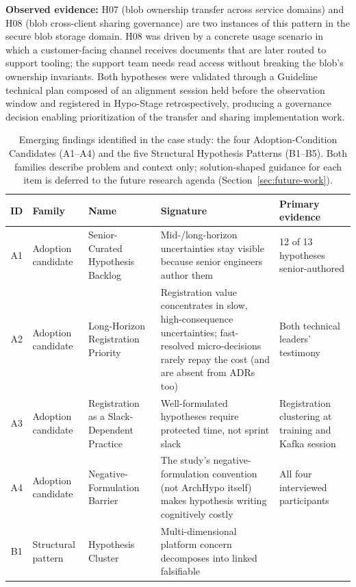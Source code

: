 \textbf{Observed evidence:} H07 (blob ownership transfer across service domains)
and H08 (blob cross-client sharing governance) are two instances of this pattern
in the secure blob storage domain. H08 was driven by a concrete usage scenario
in which a customer-facing channel receives documents that are later routed to
support tooling; the support team needs read access without breaking the blob's ownership invariants. 
Both hypotheses were validated through a Guideline technical plan composed of an alignment
session held before the observation window and registered in Hypo-Stage retrospectively,
producing a governance decision enabling prioritization of the transfer and sharing
implementation work.

\begin{table}[htbp]
\caption{Emerging findings identified in the case study: the four
Adoption-Condition Candidates (A1--A4) and the
five Structural Hypothesis Patterns (B1--B5). Both families describe problem and context only;
solution-shaped guidance for each item is deferred to the future research
agenda (Section~\ref{sec:future-work}).}
\label{tab:emerging-patterns}
\centering\small
\setlength{\tabcolsep}{4pt}
\begin{tabular}{clp{3.6cm}p{5.2cm}p{2.6cm}}
\toprule
\textbf{ID} & \textbf{Family} & \textbf{Name} & \textbf{Signature} &
\textbf{Primary evidence} \\
\midrule
A1 & Adoption candidate & Senior-Curated Hypothesis Backlog
   & Mid-/long-horizon uncertainties stay visible because senior engineers
     author them
   & 12 of 13 hypotheses senior-authored \\
A2 & Adoption candidate & Long-Horizon Registration Priority
   & Registration value concentrates in slow, high-consequence uncertainties;
     fast-resolved micro-decisions rarely repay the cost (and are absent from
     ADRs too)
   & Both technical leaders' testimony \\
A3 & Adoption candidate & Registration as a Slack-Dependent Practice
   & Well-formulated hypotheses require protected time, not sprint slack
   & Registration clustering at training and Kafka session \\
A4 & Adoption candidate & Negative-Formulation Barrier
   & The study's negative-formulation convention (not ArchHypo itself) makes
     hypothesis writing cognitively costly
   & All four interviewed participants \\
\midrule
B1 & Structural pattern & Hypothesis Cluster
   & Multi-dimensional platform concern decomposes into linked falsifiable

\end{tabular}
\end{table}
